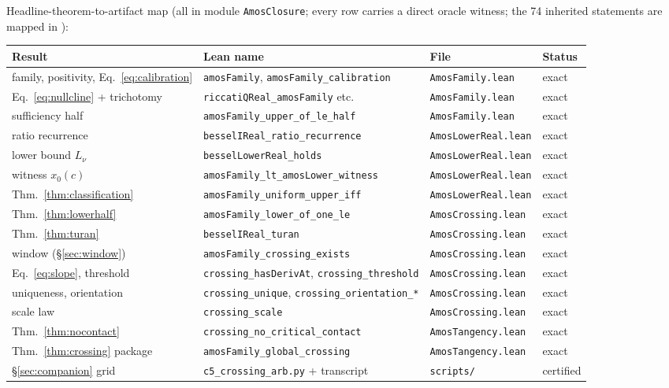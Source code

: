 \documentclass[11pt]{article}
\newcommand{\lean}[1]{\texttt{#1}}
\begin{document}
\medskip
\noindent Headline-theorem-to-artifact map (all in module
\lean{AmosClosure}; every row carries a direct oracle witness; the
74 inherited statements are mapped in
\cite{ErikssonC2,ErikssonC3,ErikssonC4}):

\begin{center}
\footnotesize
\begin{tabular}{@{}llll@{}}
\toprule
Result & Lean name & File & Status \\
\midrule
family, positivity, Eq.~\eqref{eq:calibration} & \lean{amosFamily}, \lean{amosFamily\_calibration} & \lean{AmosFamily.lean} & exact \\
Eq.~\eqref{eq:nullcline} + trichotomy & \lean{riccatiQReal\_amosFamily} etc. & \lean{AmosFamily.lean} & exact \\
sufficiency half & \lean{amosFamily\_upper\_of\_le\_half} & \lean{AmosFamily.lean} & exact \\
ratio recurrence & \lean{besselIReal\_ratio\_recurrence} & \lean{AmosLowerReal.lean} & exact \\
lower bound $L_\nu$ & \lean{besselLowerReal\_holds} & \lean{AmosLowerReal.lean} & exact \\
witness $x_0(c)$ & \lean{amosFamily\_lt\_amosLower\_witness} & \lean{AmosLowerReal.lean} & exact \\
Thm.~\ref{thm:classification} & \lean{amosFamily\_uniform\_upper\_iff} & \lean{AmosLowerReal.lean} & exact \\
Thm.~\ref{thm:lowerhalf} & \lean{amosFamily\_lower\_of\_one\_le} & \lean{AmosCrossing.lean} & exact \\
Thm.~\ref{thm:turan} & \lean{besselIReal\_turan} & \lean{AmosCrossing.lean} & exact \\
window (\S\ref{sec:window}) & \lean{amosFamily\_crossing\_exists} & \lean{AmosCrossing.lean} & exact \\
Eq.~\eqref{eq:slope}, threshold & \lean{crossing\_hasDerivAt}, \lean{crossing\_threshold} & \lean{AmosCrossing.lean} & exact \\
uniqueness, orientation & \lean{crossing\_unique}, \lean{crossing\_orientation\_*} & \lean{AmosCrossing.lean} & exact \\
scale law & \lean{crossing\_scale} & \lean{AmosCrossing.lean} & exact \\
Thm.~\ref{thm:nocontact} & \lean{crossing\_no\_critical\_contact} & \lean{AmosTangency.lean} & exact \\
Thm.~\ref{thm:crossing} package & \lean{amosFamily\_global\_crossing} & \lean{AmosTangency.lean} & exact \\
\S\ref{sec:companion} grid & \lean{c5\_crossing\_arb.py} + transcript & \lean{scripts/} & certified \\
\bottomrule
\end{tabular}
\end{center}
\end{document}
